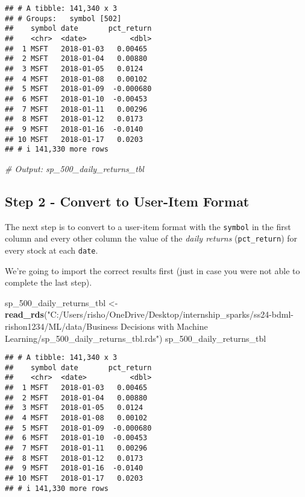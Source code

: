 \documentclass[
]{article}
\newenvironment{Shaded}{\begin{snugshade}}{\end{snugshade}}
\newcommand{\CommentTok}[1]{\textcolor[rgb]{0.56,0.35,0.01}{\textit{#1}}}
\newcommand{\FunctionTok}[1]{\textcolor[rgb]{0.13,0.29,0.53}{\textbf{#1}}}
\newcommand{\NormalTok}[1]{#1}
\newcommand{\OtherTok}[1]{\textcolor[rgb]{0.56,0.35,0.01}{#1}}
\newcommand{\StringTok}[1]{\textcolor[rgb]{0.31,0.60,0.02}{#1}}
\begin{document}
\begin{verbatim}
## # A tibble: 141,340 x 3
## # Groups:   symbol [502]
##    symbol date       pct_return
##    <chr>  <date>          <dbl>
##  1 MSFT   2018-01-03   0.00465 
##  2 MSFT   2018-01-04   0.00880 
##  3 MSFT   2018-01-05   0.0124  
##  4 MSFT   2018-01-08   0.00102 
##  5 MSFT   2018-01-09  -0.000680
##  6 MSFT   2018-01-10  -0.00453 
##  7 MSFT   2018-01-11   0.00296 
##  8 MSFT   2018-01-12   0.0173  
##  9 MSFT   2018-01-16  -0.0140  
## 10 MSFT   2018-01-17   0.0203  
## # i 141,330 more rows
\end{verbatim}

\begin{Shaded}
\begin{Highlighting}[]
\CommentTok{\# Output: sp\_500\_daily\_returns\_tbl}
\end{Highlighting}
\end{Shaded}

\hypertarget{step-2---convert-to-user-item-format}{%
\subsection{Step 2 - Convert to User-Item
Format}\label{step-2---convert-to-user-item-format}}

The next step is to convert to a user-item format with the
\texttt{symbol} in the first column and every other column the value of
the \emph{daily returns} (\texttt{pct\_return}) for every stock at each
\texttt{date}.

We're going to import the correct results first (just in case you were
not able to complete the last step).

\begin{Shaded}
\begin{Highlighting}[]
\NormalTok{sp\_500\_daily\_returns\_tbl }\OtherTok{\textless{}{-}} \FunctionTok{read\_rds}\NormalTok{(}\StringTok{"C:/Users/risho/OneDrive/Desktop/internship\_sparks/ss24{-}bdml{-}rishon1234/ML/data/Business Decisions with Machine Learning/sp\_500\_daily\_returns\_tbl.rds"}\NormalTok{)}
\NormalTok{sp\_500\_daily\_returns\_tbl}
\end{Highlighting}
\end{Shaded}

\begin{verbatim}
## # A tibble: 141,340 x 3
##    symbol date       pct_return
##    <chr>  <date>          <dbl>
##  1 MSFT   2018-01-03   0.00465 
##  2 MSFT   2018-01-04   0.00880 
##  3 MSFT   2018-01-05   0.0124  
##  4 MSFT   2018-01-08   0.00102 
##  5 MSFT   2018-01-09  -0.000680
##  6 MSFT   2018-01-10  -0.00453 
##  7 MSFT   2018-01-11   0.00296 
##  8 MSFT   2018-01-12   0.0173  
##  9 MSFT   2018-01-16  -0.0140  
## 10 MSFT   2018-01-17   0.0203  
## # i 141,330 more rows
\end{verbatim}
\end{document}
